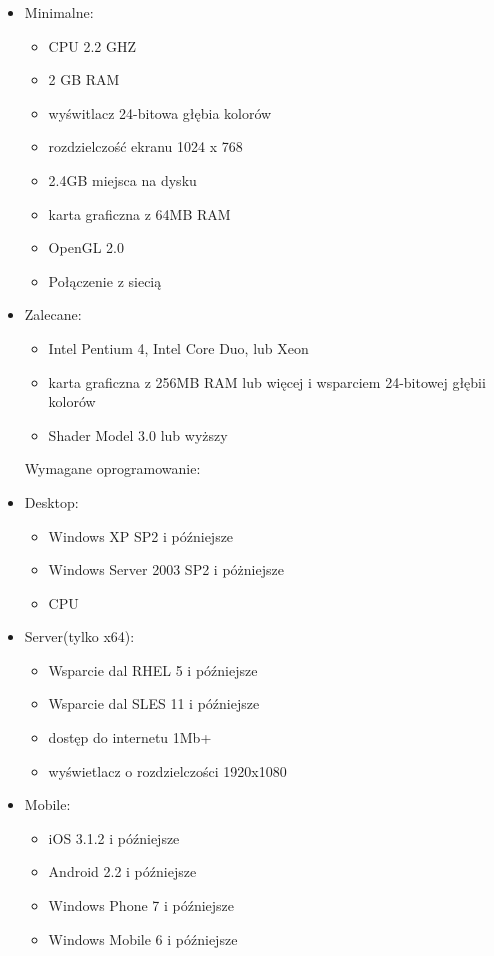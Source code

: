 \documentclass[11pt,a4paper]{article}
\begin{document}
\begin{itemize}
	\item Minimalne:
		\begin{itemize}
		\item CPU 2.2 GHZ
    		\item 2 GB RAM
		\item wyświtlacz 24-bitowa głębia kolorów
		\item rozdzielczość ekranu 1024 x 768
		\item 2.4GB miejsca na dysku
		\item karta graficzna z 64MB RAM 
		\item OpenGL 2.0
		\item Połączenie z siecią
		\end{itemize}
	\item Zalecane:
		\begin{itemize}
		\item Intel Pentium 4, Intel Core Duo, lub Xeon 
    		\item karta graficzna z 256MB RAM lub więcej i wsparciem 24-bitowej głębii kolorów
    		\item Shader Model 3.0 lub wyższy
		\end{itemize}
\raggedright{Wymagane oprogramowanie:}		
	\item Desktop:	
		\begin{itemize}
		\item Windows XP SP2 i późniejsze
    		\item Windows Server 2003 SP2 i póżniejsze
    		\item CPU 
		\end{itemize}
	\item Server(tylko x64): 
		\begin{itemize}
		\item Wsparcie dal RHEL 5 i późniejsze
    		\item Wsparcie dal SLES 11 i późniejsze
    		\item dostęp do internetu 1Mb+
    		\item wyświetlacz o rozdzielczości 1920x1080
		\end{itemize}
	\item Mobile: 
		\begin{itemize}
		\item iOS 3.1.2 i późniejsze
    		\item Android 2.2 i późniejsze
    		\item Windows Phone 7 i późniejsze
    		\item Windows Mobile 6 i późniejsze 
		\end{itemize}
\end{itemize}
\raggedright
\end{document}
